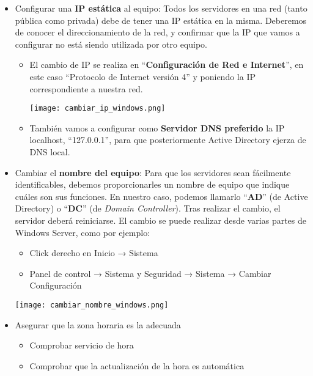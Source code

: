 \begin{itemize}
    \item Configurar una \textbf{IP estática} al equipo: Todos los servidores en una red (tanto pública como privada) debe de tener una IP estática en la misma. Deberemos de conocer el direccionamiento de la red, y confirmar que la IP que vamos a configurar no está siendo utilizada por otro equipo.
    \begin{itemize}
        \item El cambio de IP se realiza en “\textbf{Configuración de Red e Internet}”, en este caso “Protocolo de Internet versión 4” y poniendo la IP correspondiente a nuestra red.
        \begin{center}
            \texttt{[image: cambiar\_ip\_windows.png]}
        \end{center}
        \item También vamos a configurar como \textbf{Servidor DNS preferido} la IP localhost, “127.0.0.1”, para que posteriormente Active Directory ejerza de DNS local.
    \end{itemize}

    \hypertarget{cambiar_nombre_equipo}{}
    \item Cambiar el \textbf{nombre del equipo}: Para que los servidores sean fácilmente identificables, debemos proporcionarles un nombre de equipo que indique cuáles son sus funciones. En nuestro caso, podemos llamarlo “\textbf{AD}” (de Active Directory) o “\textbf{DC}” (de \textit{Domain Controller}). Tras realizar el cambio, el servidor deberá reiniciarse. El cambio se puede realizar desde varias partes de Windows Server, como por ejemplo:
    \begin{itemize}
        \item Click derecho en Inicio → Sistema
        \item Panel de control → Sistema y Seguridad → Sistema → Cambiar Configuración
    \end{itemize}
    \begin{center}
        \texttt{[image: cambiar\_nombre\_windows.png]}
    \end{center}

    \item Asegurar que la zona horaria es la adecuada
    \begin{itemize}
        \item Comprobar servicio de hora
        \item Comprobar que la actualización de la hora es automática
    \end{itemize}

\end{itemize}


